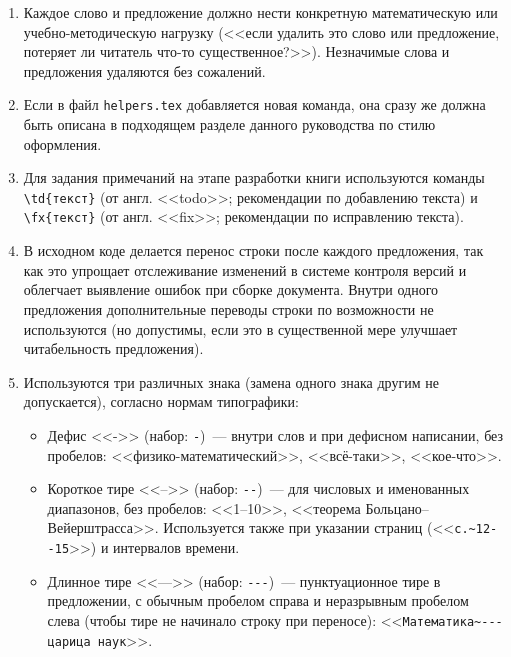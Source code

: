 \begin{enumerate}
    \item {}
        Каждое слово и предложение должно нести конкретную математическую или учебно-методическую нагрузку (<<если удалить это слово или предложение, потеряет ли читатель что-то существенное?>>).
        Незначимые слова и предложения удаляются без сожалений.

    \item {}
        Если в файл \verb|helpers.tex| добавляется новая команда, она сразу же должна быть описана в подходящем разделе данного руководства по стилю оформления.

    \item {}
        Для задания примечаний на этапе разработки книги используются команды \verb|\td{текст}| (от англ. <<todo>>; рекомендации по добавлению текста) и \verb|\fx{текст}| (от англ. <<fix>>; рекомендации по исправлению текста).

    \item {}
        В исходном коде делается перенос строки после каждого предложения, так как это упрощает отслеживание изменений в системе контроля версий и облегчает выявление ошибок при сборке документа.
        Внутри одного предложения дополнительные переводы строки по возможности не используются (но допустимы, если это в существенной мере улучшает читабельность предложения).

    \item {}
        Используются три различных знака (замена одного знака другим не допускается), согласно нормам типографики:
        \begin{itemize}
            \item Дефис <<->>
                (набор: \verb|-|)~---
                внутри слов и при дефисном написании, без пробелов: <<физико-математический>>, <<всё-таки>>, <<кое-что>>.
            \item Короткое тире <<-->>
                (набор: \verb|--|)~---
                для числовых и именованных диапазонов, без пробелов: <<1--10>>, <<теорема Больцано--Вейерштрасса>>.
                Используется также при указании страниц (<<\verb|с.~12--15|>>) и интервалов времени.
            \item Длинное тире <<--->>
                (набор: \verb|---|)~---
                пунктуационное тире в предложении, с обычным пробелом справа и неразрывным пробелом слева (чтобы тире не начинало строку при переносе): <<\verb|Математика~--- царица наук|>>.
        \end{itemize}


\end{enumerate}
